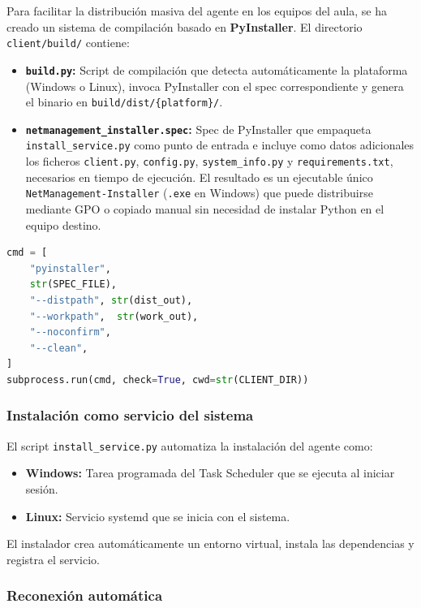 \documentclass[12pt, a4paper, twoside]{article}
\begin{document}
Para facilitar la distribución masiva del agente en los equipos del aula, se ha creado un sistema de compilación basado en \textbf{PyInstaller}. El directorio \texttt{client/build/} contiene:

\begin{itemize}
  \item \textbf{\texttt{build.py}:} Script de compilación que detecta automáticamente la plataforma (Windows o Linux), invoca PyInstaller con el spec correspondiente y genera el binario en \texttt{build/dist/\{platform\}/}.
  \item \textbf{\texttt{netmanagement\_installer.spec}:} Spec de PyInstaller que empaqueta \texttt{install\_service.py} como punto de entrada e incluye como datos adicionales los ficheros \texttt{client.py}, \texttt{config.py}, \texttt{system\_info.py} y \texttt{requirements.txt}, necesarios en tiempo de ejecución. El resultado es un ejecutable único \texttt{NetManagement-Installer} (\texttt{.exe} en Windows) que puede distribuirse mediante GPO o copiado manual sin necesidad de instalar Python en el equipo destino.
\end{itemize}

\begin{lstlisting}[language=Python, caption={Fragmento del script de compilación build.py.}]
cmd = [
    "pyinstaller",
    str(SPEC_FILE),
    "--distpath", str(dist_out),
    "--workpath",  str(work_out),
    "--noconfirm",
    "--clean",
]
subprocess.run(cmd, check=True, cwd=str(CLIENT_DIR))
\end{lstlisting}

\subsubsection{Instalación como servicio del sistema}

El script \texttt{install\_service.py} automatiza la instalación del agente como:

\begin{itemize}
  \item \textbf{Windows:} Tarea programada del Task Scheduler que se ejecuta al iniciar sesión.
  \item \textbf{Linux:} Servicio systemd que se inicia con el sistema.
\end{itemize}

El instalador crea automáticamente un entorno virtual, instala las dependencias y registra el servicio.

\subsubsection{Reconexión automática}
\end{document}
